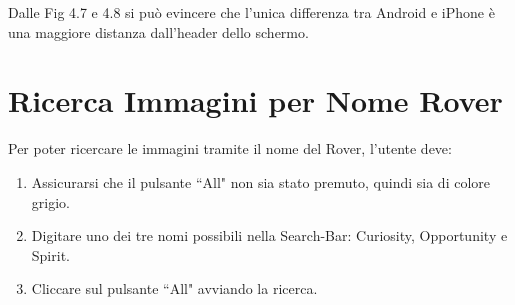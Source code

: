 Dalle Fig 4.7 e 4.8 si pu\`o evincere che l'unica differenza tra Android e iPhone \`e una maggiore distanza dall'header dello schermo.
\section*{Ricerca Immagini per Nome Rover}
Per poter ricercare le immagini tramite il nome del Rover, l'utente deve:

\begin{enumerate}
    \item Assicurarsi che il pulsante ``All" non sia stato premuto, quindi sia di colore grigio.
    \item Digitare uno dei tre nomi possibili nella Search-Bar: Curiosity, Opportunity e Spirit.
    \item Cliccare sul pulsante ``All" avviando la ricerca.
\end{enumerate}


